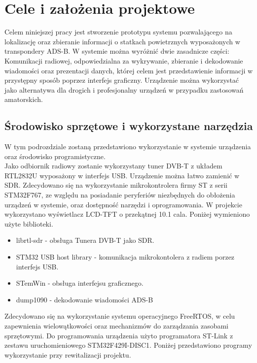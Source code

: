 \documentclass[eng,printmode]{mgr}
\begin{document}



\chapter{ Cele i założenia projektowe }
Celem niniejszej pracy jest stworzenie prototypu systemu pozwalającego na lokalizację oraz zbieranie informacji o  statkach powietrznych wyposażonych w transpondery ADS-B. W systemie można wyróżnić dwie zasadnicze części: 
Komunikacji radiowej, odpowiedzialna za wykrywanie, zbieranie i dekodowanie wiadomości oraz prezentacji danych, której celem jest przedstawienie informacji w przystępny sposób poprzez interfejs graficzny. Urządzenie można wykorzystać jako alternatywa dla drogich i profesjonalny urządzeń w przypadku zastosowań amatorskich.

\section{Środowisko sprzętowe i wykorzystane narzędzia}
W tym podrozdziale zostaną przedstawiono wykorzystanie w systemie urządzenia oraz środowisko programistyczne.
\\
Jako odbiornik radiowy zostanie wykorzystany tuner DVB-T z układem RTL2832U wyposażony w interfejs USB. Urządzenie można łatwo zamienić w SDR. Zdecydowano się na wykorzystanie mikrokontrolera firmy ST z serii STM32F767, ze względu na posiadanie peryferiów niezbędnych do obłożenia urządzeń w systemie, oraz dostępność narzędzi i oprogramowania. W projekcie wykorzystano wyświetlacz LCD-TFT o przekątnej 10.1 cala.
Poniżej wymieniono użyte biblioteki.
\begin{itemize}
  \item librtl-sdr - obsługa Tunera DVB-T jako SDR.
  \item STM32 USB host library - komunikacja mikrokontolera z radiem porzez interfejs USB.
  \item STemWin - obsługa interfejsu graficznego.
  \item dump1090 - dekodowanie wiadomości ADS-B
\end{itemize}

Zdecydowano się na wykorzystanie systemu operacyjnego FreeRTOS, w celu zapewnienia wielowątkowości oraz mechanizmów do zarządzania zasobami sprzętowymi. Do programowania urządzenia użyto programatora ST-Link z zestawu uruchomieniowego STM32F429I-DISC1. Poniżej przedstawiono programy wykorzystanie przy rewitalizacji projektu.
\end{document}
